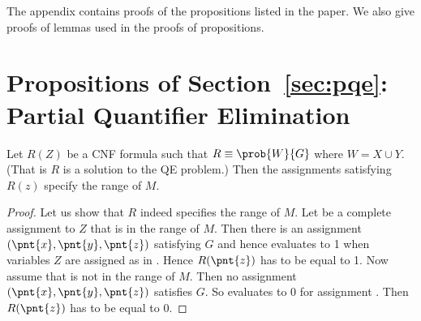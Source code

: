 \appendix
\setcounter{proposition}{0}


The appendix contains   proofs of the propositions  listed in the paper.
We also give proofs of lemmas  used in the proofs of propositions.

\section*{Propositions of Section~\ref{sec:pqe}: Partial Quantifier Elimination}
\begin{proposition}
Let $R(Z)$ be a CNF formula such that $R \equiv \prob{W}{G}$ where
$W = X \cup Y$. (That is $R$ is a solution to the QE problem.)
Then the assignments satisfying $R(z)$ specify the range of $M$.
\end{proposition}
\begin{proof}
Let us show that $R$ indeed specifies the range of $M$. Let  be
a complete assignment to $Z$ that is in the range of $M$. Then there
is an assignment $(\pnt{x},\pnt{y},\pnt{z})$ satisfying $G$ and hence
 evaluates to 1 when variables $Z$ are assigned as in 
. Hence $R(\pnt{z})$ has to be equal to 1.  Now assume that
 is not in the range of $M$. Then no assignment
$(\pnt{x},\pnt{y},\pnt{z})$ satisfies $G$. So  evaluates to
0 for assignment . Then $R(\pnt{z})$ has to be equal to 0.
\end{proof}

